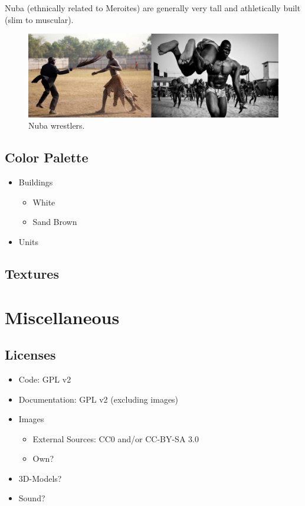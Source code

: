 \documentclass[a4paper,12pt]{scrreprt}
\begin{document}
Nuba (ethnically related to Meroites) are generally very tall and athletically built (slim to muscular).

\begin{figure}[H]
	\centering
	\includegraphics[width=\textwidth]{img/people/nuba_wrestler}
	\caption{Nuba wrestlers.}
\end{figure}

\section{Color Palette}

\begin{itemize}
	\item Buildings
	\begin{itemize}
		\item White
		\item Sand Brown
	\end{itemize}
	\item Units
\end{itemize}

\section{Textures}

\chapter{Miscellaneous}

\section{Licenses}

\begin{itemize}
	\item Code: GPL v2
	\item Documentation: GPL v2 (excluding images)
	\item Images
	\begin{itemize}
		\item External Sources: CC0 and/or CC-BY-SA 3.0
		\item Own?
	\end{itemize}
	\item 3D-Models?
	\item Sound?
\end{itemize}
\end{document}
